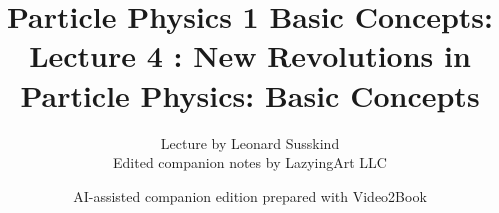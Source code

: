 \documentclass[11pt,oneside]{book}
\begin{document}
\frontmatter
\title{Particle Physics 1 Basic Concepts: Lecture 4 : New Revolutions in Particle Physics: Basic Concepts}
\author{Lecture by Leonard Susskind\\Edited companion notes by LazyingArt LLC}
\date{AI-assisted companion edition prepared with Video2Book}
\maketitle
\clearpage
\mainmatter

\end{document}
